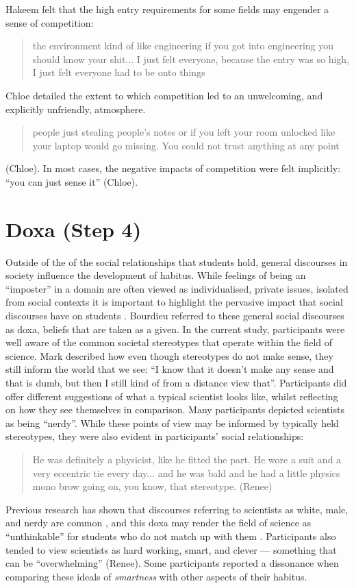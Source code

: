 Hakeem felt that the high entry requirements for some fields may engender a sense of competition: \blockquote{the environment kind of like engineering if you got into engineering you should know your shit... I just felt everyone, because the entry was so high, I just felt everyone had to be onto things} Chloe detailed the extent to which competition led to an unwelcoming, and explicitly unfriendly, atmosphere. \blockquote{people just stealing people’s notes or if you left your room unlocked like your laptop would go missing. You could not trust anything at any point} (Chloe). In most cases, the negative impacts of competition were felt implicitly: ``you can just sense it'' (Chloe). 




\section{Doxa (Step 4)}
Outside of the of the social relationships that students hold, general discourses in society influence the development of habitus. 
While feelings of being an ``imposter'' in a domain are often viewed as individualised, private issues, isolated from social contexts it is important to highlight the pervasive impact that social discourses have on students  \citep{breeze2018imposter}. Bourdieu referred to these general social discourses as doxa, beliefs that are taken as a given. In the current study, participants were well aware of the common societal stereotypes that operate within the field of science. Mark described how even though stereotypes do not make sense, they still inform the world that we see: ``I know that it doesn't make any sense and that is dumb, but then I still kind of from a distance view that''. Participants did offer different suggestions of what a typical scientist looks like, whilst reflecting on how they see themselves in comparison. Many participants depicted scientists as being ``nerdy''. While these points of view may be informed by typically held stereotypes, they were also evident in participants' social relationships: \blockquote{He was definitely a physicist, like he fitted the part. He wore a suit and a very eccentric tie every day... and he was bald and he had a little physics mono brow going on, you know, that stereotype. (Renee)} Previous research has shown that discourses referring to scientists as white, male, and nerdy are common \cite{Nosek_2009}, and this doxa may render the field of science as ``unthinkable'' for students who do not match up with them \cite{Archer_2013}. Participants also tended to view scientists as hard working, smart, and clever --- something that can be ``overwhelming'' (Renee).   Some participants reported a dissonance when comparing these ideals of \textit{smartness} with other aspects of their habitus.

